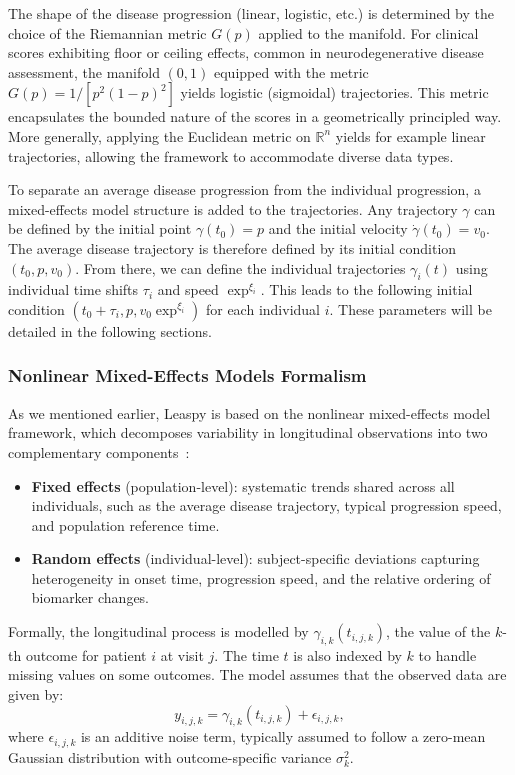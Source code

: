 \documentclass{rapportCS}
\begin{document}
The shape of the disease progression (linear, logistic, etc.) is determined by the choice of the Riemannian metric $G(p)$ applied to the manifold. For clinical scores exhibiting floor or ceiling effects, common in neurodegenerative disease assessment, the manifold $(0,1)$ equipped with the metric $G(p) = 1/[p^2(1-p)^2]$ yields logistic (sigmoidal) trajectories. This metric encapsulates the bounded nature of the scores in a geometrically principled way. More generally, applying the Euclidean metric on $\mathbb{R}^n$ yields for example linear trajectories, allowing the framework to accommodate diverse data types. 

To separate an average disease progression from the individual progression, a mixed-effects model structure is added to the trajectories. Any trajectory $\gamma$ can be defined by the initial point $\gamma(t_0) = p$ and the initial velocity $\dot{\gamma}(t_0) = v_0$. The average disease trajectory is therefore defined by its initial condition $(t_0, p, v_0)$. From there, we can define the individual trajectories $\gamma_i(t)$ using individual time shifts $\tau_i$ and speed $\exp^{\xi_i}$. This leads to the following initial condition $(t_0 + \tau_i, p, v_0 \exp^{\xi_i})$ for each individual $i$. These parameters will be detailed in the following sections.

\subsubsection{Nonlinear Mixed-Effects Models Formalism}

As we mentioned earlier, Leaspy is based on the nonlinear mixed-effects model framework, which decomposes variability in longitudinal observations into two complementary components~\cite{schiratti2017bayesian}:

\begin{itemize}
  \item \textbf{Fixed effects} (population-level): systematic trends shared across all individuals, such as the average disease trajectory, typical progression speed, and population reference time.
  \item \textbf{Random effects} (individual-level): subject-specific deviations capturing heterogeneity in onset time, progression speed, and the relative ordering of biomarker changes.
\end{itemize}

Formally, the longitudinal process is modelled by $\gamma_{i,k}(t_{i,j,k})$, the value of the $k$-th outcome for patient $i$ at visit $j$. The time $t$ is also indexed by $k$ to handle missing values on some outcomes. The model assumes that the observed data are given by:
\begin{equation}
y_{i,j,k} = \gamma_{i,k}(t_{i,j,k}) + \epsilon_{i,j,k},
\end{equation} 
where $\epsilon_{i,j,k}$ is an additive noise term, typically assumed to follow a zero-mean Gaussian distribution with outcome-specific variance $\sigma_k^2$. 
\end{document}
